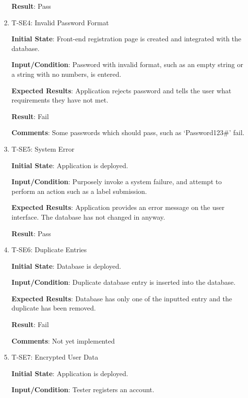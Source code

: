 \documentclass[12pt, titlepage]{article}
\begin{document}
\begin{enumerate}
\textbf{Result}: Pass

\item{T-SE4: Invalid Password Format\\}

					
\textbf{Initial State}: Front-end registration page is created and integrated with the database.
					
\textbf{Input/Condition}: Password with invalid format, such as an empty string or a string with no numbers, is entered.
					
\textbf{Expected Results}: Application rejects password and tells the user what requirements they have not met.
					
\textbf{Result}: Fail

\textbf{Comments}: Some passwords which should pass, such as `Password123\#' fail.

\item{T-SE5: System Error\\}


					
\textbf{Initial State}: Application is deployed.
					
\textbf{Input/Condition}: Purposely invoke a system failure, and attempt to perform an action such as a label submission.
					
\textbf{Expected Results}: Application provides an error message on the user interface. The database has not changed in anyway.
					
\textbf{Result}: Pass



\item{T-SE6: Duplicate Entries\\}

					
\textbf{Initial State}: Database is deployed.
					
\textbf{Input/Condition}: Duplicate database entry is inserted into the database.
					
\textbf{Expected Results}: Database has only one of the inputted entry and the duplicate has been removed.
					
\textbf{Result}: Fail

\textbf{Comments}: Not yet implemented


\item{T-SE7: Encrypted User Data\\}

					
\textbf{Initial State}: Application is deployed.
					
\textbf{Input/Condition}: Tester registers an account.
					

\end{enumerate}
\end{document}
